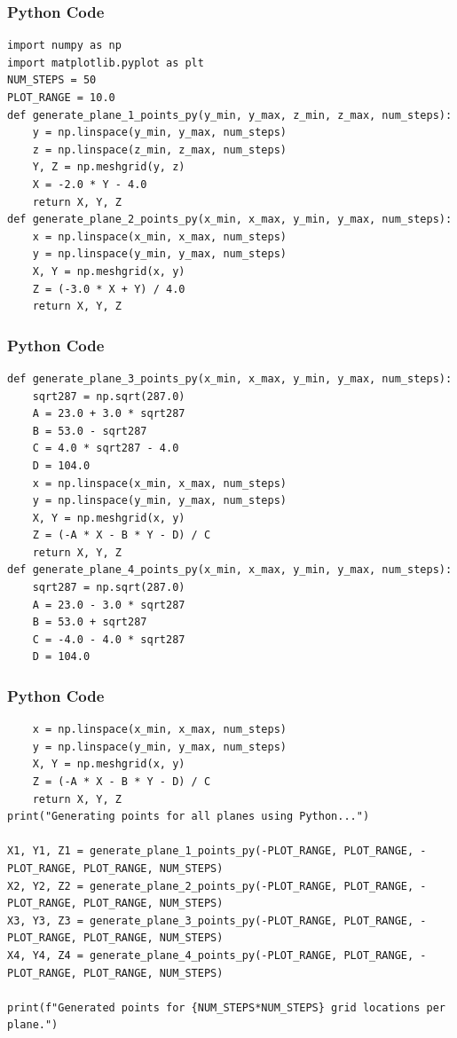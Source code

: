 \documentclass{beamer}
\begin{document}
\begin{frame}[fragile]
    \frametitle{Python Code}
    \begin{lstlisting}
import numpy as np
import matplotlib.pyplot as plt
NUM_STEPS = 50
PLOT_RANGE = 10.0
def generate_plane_1_points_py(y_min, y_max, z_min, z_max, num_steps):
    y = np.linspace(y_min, y_max, num_steps)
    z = np.linspace(z_min, z_max, num_steps)
    Y, Z = np.meshgrid(y, z)
    X = -2.0 * Y - 4.0
    return X, Y, Z
def generate_plane_2_points_py(x_min, x_max, y_min, y_max, num_steps):
    x = np.linspace(x_min, x_max, num_steps)
    y = np.linspace(y_min, y_max, num_steps)
    X, Y = np.meshgrid(x, y)
    Z = (-3.0 * X + Y) / 4.0
    return X, Y, Z
\end{lstlisting}
\end{frame}
\begin{frame}[fragile]
    \frametitle{Python Code}
    \begin{lstlisting}
def generate_plane_3_points_py(x_min, x_max, y_min, y_max, num_steps):
    sqrt287 = np.sqrt(287.0)
    A = 23.0 + 3.0 * sqrt287
    B = 53.0 - sqrt287
    C = 4.0 * sqrt287 - 4.0
    D = 104.0  
    x = np.linspace(x_min, x_max, num_steps)
    y = np.linspace(y_min, y_max, num_steps)
    X, Y = np.meshgrid(x, y)
    Z = (-A * X - B * Y - D) / C
    return X, Y, Z
def generate_plane_4_points_py(x_min, x_max, y_min, y_max, num_steps):
    sqrt287 = np.sqrt(287.0)
    A = 23.0 - 3.0 * sqrt287
    B = 53.0 + sqrt287
    C = -4.0 - 4.0 * sqrt287
    D = 104.0
\end{lstlisting}
\end{frame}
\begin{frame}[fragile]
    \frametitle{Python Code}
    \begin{lstlisting}
    x = np.linspace(x_min, x_max, num_steps)
    y = np.linspace(y_min, y_max, num_steps)
    X, Y = np.meshgrid(x, y)
    Z = (-A * X - B * Y - D) / C
    return X, Y, Z
print("Generating points for all planes using Python...")

X1, Y1, Z1 = generate_plane_1_points_py(-PLOT_RANGE, PLOT_RANGE, -PLOT_RANGE, PLOT_RANGE, NUM_STEPS)
X2, Y2, Z2 = generate_plane_2_points_py(-PLOT_RANGE, PLOT_RANGE, -PLOT_RANGE, PLOT_RANGE, NUM_STEPS)
X3, Y3, Z3 = generate_plane_3_points_py(-PLOT_RANGE, PLOT_RANGE, -PLOT_RANGE, PLOT_RANGE, NUM_STEPS)
X4, Y4, Z4 = generate_plane_4_points_py(-PLOT_RANGE, PLOT_RANGE, -PLOT_RANGE, PLOT_RANGE, NUM_STEPS)

print(f"Generated points for {NUM_STEPS*NUM_STEPS} grid locations per plane.")
\end{lstlisting}
\end{frame}
\end{document}
